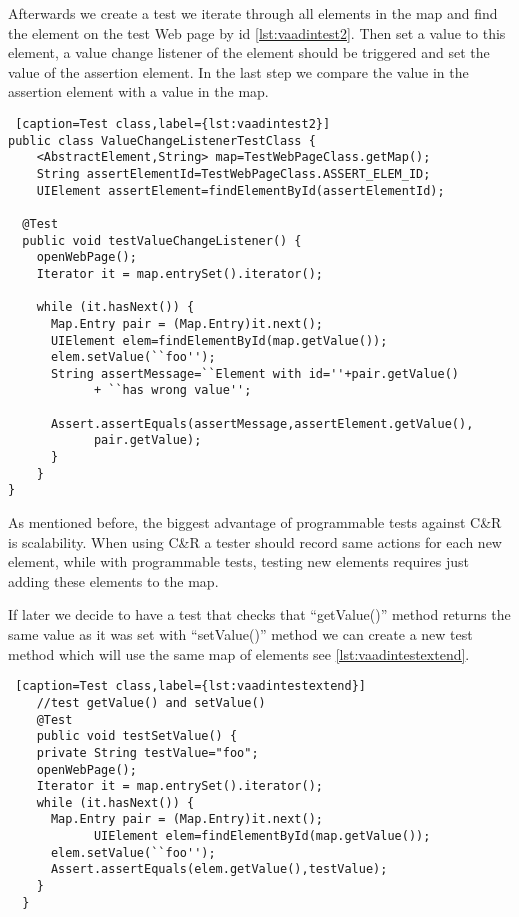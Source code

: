 Afterwards we create a test we iterate through all elements in the map and
find the element on the test Web page by id \ref{lst:vaadintest2}. Then set a
value to this element, a value change listener of the element should be triggered and set the value
of the assertion element. In the last step we compare the value in the
assertion element with a value in the map.

\lstset{style=a1listing}			
\begin{lstlisting} [caption=Test class,label={lst:vaadintest2}]
public class ValueChangeListenerTestClass {
	<AbstractElement,String> map=TestWebPageClass.getMap();
	String assertElementId=TestWebPageClass.ASSERT_ELEM_ID;
	UIElement assertElement=findElementById(assertElementId);
       
  @Test
  public void testValueChangeListener() {
    openWebPage();
    Iterator it = map.entrySet().iterator();
          
    while (it.hasNext()) {
      Map.Entry pair = (Map.Entry)it.next();
      UIElement elem=findElementById(map.getValue());
      elem.setValue(``foo'');
      String assertMessage=``Element with id=''+pair.getValue()
        	+ ``has wrong value'';
        
      Assert.assertEquals(assertMessage,assertElement.getValue(),
        	pair.getValue);
      }
    }
}
\end{lstlisting}
  
      As mentioned before, the biggest advantage of programmable tests against
      C\&R is scalability. When using C\&R a
      tester should record same actions for each new element, while with 
      programmable tests, testing new elements requires just adding these elements to the map.
      
      If later we decide to have a test that checks that ``getValue()'' method
      returns the same value as it was set with ``setValue()'' method we can create
      a new test method which will use the same map of elements see
      \ref{lst:vaadintestextend}.

\lstset{style=a1listing}      
\begin{lstlisting} [caption=Test class,label={lst:vaadintestextend}]
	//test getValue() and setValue()
	@Test
	public void testSetValue() {
    private String testValue="foo";
    openWebPage();
  	Iterator it = map.entrySet().iterator();
    while (it.hasNext()) {
      Map.Entry pair = (Map.Entry)it.next();
			UIElement elem=findElementById(map.getValue());
      elem.setValue(``foo'');  
      Assert.assertEquals(elem.getValue(),testValue);        
    }
  }
\end{lstlisting}


